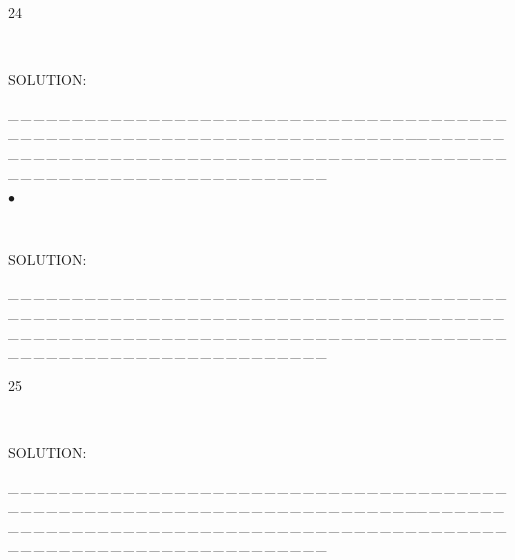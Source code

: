 \documentclass[a4paper, 11pt, UTF8]{article}
\begin{document}
\begin{large}
{\timesbf\Large 24} {\timessl\Large 
}\par\quad\,
{\timessl\Large
}\par
{\timesbf S\footnotesize{OLUTION:}}\par\quad

\par
{\tiny \_\,\_\,\_\,\_\,\_\,\_\,\_\,\_\,\_\,\_\,\_\,\_\,\_\,\_\,\_\,\_\,\_\,\_\,\_\,\_\,\_\,\_\,\_\,\_\,\_\,\_\,\_\,\_\,\_\,\_\,\_\,\_\,\_\,\_\,\_\,\_\,\_\,\_\,\_\,\_\,\_\,\_\,\_\,\_\,\_\,\_\,\_\,\_\,\_\,\_\,\_\,\_\,\_\,\_\,\_\,\_\,\_\,\_\,\_\,\_\,\_\,\_\,\_\,\_\,\_\,\_\,\_\,\_\,\_\,\_\,\_\_\,\_\,\_\,\_\,\_\,\_\,\_\,\_\,\_\,\_\,\_\,\_\,\_\,\_\,\_\,\_\,\_\,\_\,\_\,\_\,\_\,\_\,\_\,\_\,\_\,\_\,\_\,\_\,\_\,\_\,\_\,\_\,\_\,\_\,\_\,\_\,\_\,\_\,\_\,\_\,\_\,\_\,\_\,\_\,\_\,\_\,\_\,\_\,\_\,\_\,\_\,\_\,\_\,\_\,\_\,\_\,\_\,\_\,\_\,\_\,\_\,\_\,\_\,\_\,\_\,\_\,\_\,\_\,\_\,\_\,\_}\par

{\small $\bullet$} {\timessl\Large 
}\par\quad\,
{\timessl\Large
}\par
{\timesbf S\footnotesize{OLUTION:}}\par\quad

\par
{\tiny \_\,\_\,\_\,\_\,\_\,\_\,\_\,\_\,\_\,\_\,\_\,\_\,\_\,\_\,\_\,\_\,\_\,\_\,\_\,\_\,\_\,\_\,\_\,\_\,\_\,\_\,\_\,\_\,\_\,\_\,\_\,\_\,\_\,\_\,\_\,\_\,\_\,\_\,\_\,\_\,\_\,\_\,\_\,\_\,\_\,\_\,\_\,\_\,\_\,\_\,\_\,\_\,\_\,\_\,\_\,\_\,\_\,\_\,\_\,\_\,\_\,\_\,\_\,\_\,\_\,\_\,\_\,\_\,\_\,\_\,\_\_\,\_\,\_\,\_\,\_\,\_\,\_\,\_\,\_\,\_\,\_\,\_\,\_\,\_\,\_\,\_\,\_\,\_\,\_\,\_\,\_\,\_\,\_\,\_\,\_\,\_\,\_\,\_\,\_\,\_\,\_\,\_\,\_\,\_\,\_\,\_\,\_\,\_\,\_\,\_\,\_\,\_\,\_\,\_\,\_\,\_\,\_\,\_\,\_\,\_\,\_\,\_\,\_\,\_\,\_\,\_\,\_\,\_\,\_\,\_\,\_\,\_\,\_\,\_\,\_\,\_\,\_\,\_\,\_\,\_\,\_}\par

{\timesbf\Large 25} {\timessl\Large 
}\par\quad\,
{\timessl\Large
}\par
{\timesbf S\footnotesize{OLUTION:}}\par\quad

\par
{\tiny \_\,\_\,\_\,\_\,\_\,\_\,\_\,\_\,\_\,\_\,\_\,\_\,\_\,\_\,\_\,\_\,\_\,\_\,\_\,\_\,\_\,\_\,\_\,\_\,\_\,\_\,\_\,\_\,\_\,\_\,\_\,\_\,\_\,\_\,\_\,\_\,\_\,\_\,\_\,\_\,\_\,\_\,\_\,\_\,\_\,\_\,\_\,\_\,\_\,\_\,\_\,\_\,\_\,\_\,\_\,\_\,\_\,\_\,\_\,\_\,\_\,\_\,\_\,\_\,\_\,\_\,\_\,\_\,\_\,\_\,\_\_\,\_\,\_\,\_\,\_\,\_\,\_\,\_\,\_\,\_\,\_\,\_\,\_\,\_\,\_\,\_\,\_\,\_\,\_\,\_\,\_\,\_\,\_\,\_\,\_\,\_\,\_\,\_\,\_\,\_\,\_\,\_\,\_\,\_\,\_\,\_\,\_\,\_\,\_\,\_\,\_\,\_\,\_\,\_\,\_\,\_\,\_\,\_\,\_\,\_\,\_\,\_\,\_\,\_\,\_\,\_\,\_\,\_\,\_\,\_\,\_\,\_\,\_\,\_\,\_\,\_\,\_\,\_\,\_\,\_\,\_}\par


\end{large}
\end{document}
